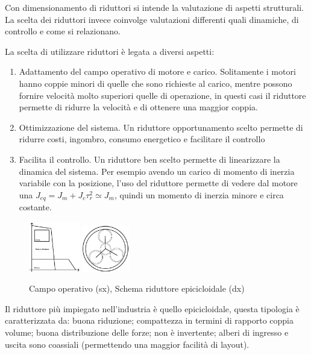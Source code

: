 Con dimensionamento di riduttori si intende la valutazione di aspetti strutturali. La scelta dei riduttori invece coinvolge valutazioni differenti quali dinamiche, di controllo e come si relazionano.

La scelta di utilizzare riduttori è legata a diversi aspetti:
\begin{enumerate}
    \item Adattamento del campo operativo di motore e carico. Solitamente i motori hanno coppie minori di quelle che sono richieste al carico, mentre possono fornire velocità molto superiori quelle di operazione, in questi casi il riduttore permette di ridurre la velocità e di ottenere una maggior coppia.
    \item Ottimizzazione del sistema. Un riduttore opportunamento scelto permette di ridurre costi, ingombro, consumo energetico e facilitare il controllo
    \item Facilita il controllo. Un riduttore ben scelto permette di linearizzare la dinamica del sistema. Per esempio avendo un carico di momento di inerzia variabile con la posizione, l'uso del riduttore permette di vedere dal motore una $J_{eq}=J_m+J_c\tau_r^2\simeq J_m$, quindi un momento di inerzia minore e circa costante.  
\end{enumerate}

\begin{figure}[h]
    \centering
    \includegraphics[width=0.2\textwidth]{Immagini/campo_operativo_riduttore.png}
    \includegraphics[width=0.18\textwidth,angle=-5]{Immagini/riduttore_epicicloidale.png}
    \caption{Campo operativo (sx), Schema riduttore epicicloidale (dx)}
\end{figure}

Il riduttore più impiegato nell'industria è quello epicicloidale, questa tipologia è caratterizzata da: buona riduzione; compattezza in termini di rapporto coppia volume; buona distribuzione delle forze; non è invertente; alberi di ingresso e uscita sono coassiali (permettendo una maggior facilità di layout).

